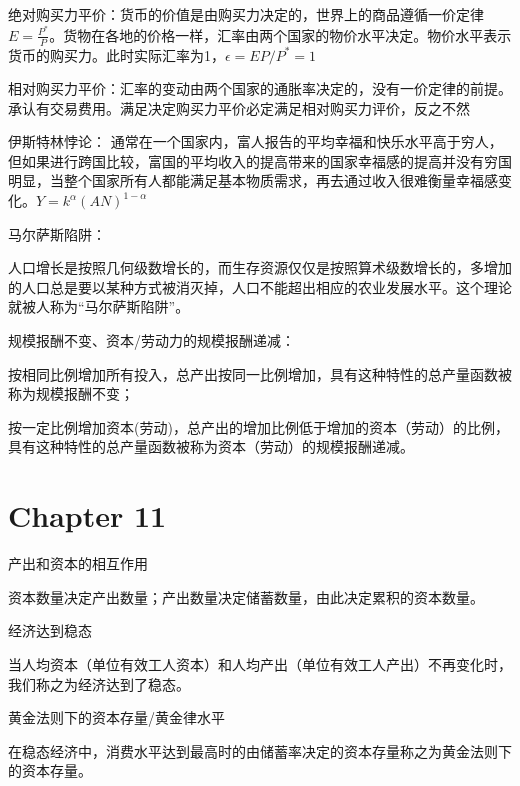 \documentclass{article}
\begin{document}
绝对购买力平价：货币的价值是由购买力决定的，世界上的商品遵循一价定律$ E=\frac{P^*}{P} $。货物在各地的价格一样，汇率由两个国家的物价水平决定。物价水平表示货币的购买力。此时实际汇率为1，$ \epsilon=EP/P^*=1 $

相对购买力平价：汇率的变动由两个国家的通胀率决定的，没有一价定律的前提。承认有交易费用。满足决定购买力平价必定满足相对购买力评价，反之不然

\hspace*{\fill}

伊斯特林悖论：
通常在一个国家内，富人报告的平均幸福和快乐水平高于穷人，但如果进行跨国比较，富国的平均收入的提高带来的国家幸福感的提高并没有穷国明显，当整个国家所有人都能满足基本物质需求，再去通过收入很难衡量幸福感变化。$ Y=k^\alpha(AN)^{1-\alpha} $

\hspace*{\fill}

马尔萨斯陷阱：

人口增长是按照几何级数增长的，而生存资源仅仅是按照算术级数增长的，多增加的人口总是要以某种方式被消灭掉，人口不能超出相应的农业发展水平。这个理论就被人称为“马尔萨斯陷阱”。

\hspace*{\fill}

规模报酬不变、资本/劳动力的规模报酬递减：

按相同比例增加所有投入，总产出按同一比例增加，具有这种特性的总产量函数被称为规模报酬不变；

按一定比例增加资本(劳动)，总产出的增加比例低于增加的资本（劳动）的比例，具有这种特性的总产量函数被称为资本（劳动）的规模报酬递减。

\section{Chapter 11}

产出和资本的相互作用

资本数量决定产出数量；产出数量决定储蓄数量，由此决定累积的资本数量。

\hspace*{\fill}

经济达到稳态

当人均资本（单位有效工人资本）和人均产出（单位有效工人产出）不再变化时，我们称之为经济达到了稳态。

\hspace*{\fill}

黄金法则下的资本存量/黄金律水平

在稳态经济中，消费水平达到最高时的由储蓄率决定的资本存量称之为黄金法则下的资本存量。
\end{document}
